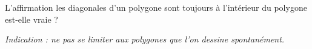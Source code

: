 L'affirmation \og les diagonales d'un polygone sont toujours à l'intérieur du
polygone \fg{} est-elle vraie ?

\emph{Indication : ne pas se limiter aux polygones que l'on dessine
spontanément.}
